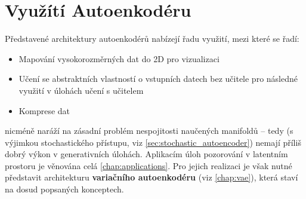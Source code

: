 \section{Využítí Autoenkodéru}
Představené architektury autoenkodérů nabízejí řadu využití, mezi které se řadí:
\begin{itemize}
    \item Mapování vysokorozměrných dat do 2D pro vizualizaci
    \item Učení se abstraktních vlastností o vstupních datech bez učitele pro následné využití v úlohách učení s učitelem
    \item Komprese dat
\end{itemize}

nicméně naráží na zásadní problém nespojitosti naučených manifoldů – tedy (s výjimkou stochastického přístupu, viz \autoref{sec:stochastic_autoencoder}) nemají příliš dobrý výkon v generativních úlohách.
Aplikacím úloh pozorování v latentním prostoru je věnována celá \autoref{chap:applications}.
Pro jejich realizaci je však nutné představit architekturu \textbf{variačního autoenkodéru} (viz \autoref{chap:vae}), která staví na dosud popsaných konceptech.